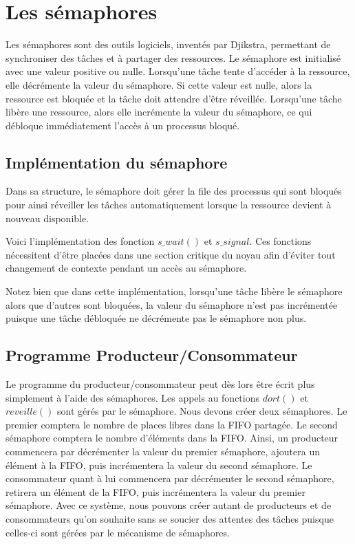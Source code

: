 \section{Les sémaphores} \label{sec:semaphores}
Les sémaphores sont des outils logiciels, inventés par Djikstra, permettant de synchroniser des tâches et à partager des ressources. Le sémaphore est initialisé avec une valeur positive ou nulle. Lorsqu'une tâche tente d'accéder à la ressource, elle décrémente la valeur du sémaphore. Si cette valeur est nulle, alors la ressource est bloquée et la tâche doit attendre d'être réveillée.
Lorsqu'une tâche libère une ressource, alors elle incrémente la valeur du sémaphore, ce qui débloque immédiatement l'accès à un processus bloqué.

\subsection{Implémentation du sémaphore}
Dans sa structure, le sémaphore doit gérer la file des processus qui sont bloqués pour ainsi réveiller les tâches automatiquement lorsque la ressource devient à nouveau disponible.


Voici l'implémentation des fonction $s\_wait()$ et $s\_signal$. Ces fonctions nécessitent d'être placées dans une section critique du noyau afin d'éviter tout changement de contexte pendant un accès au sémaphore.


Notez bien que dans cette implémentation, lorsqu'une tâche libère le sémaphore alors que d'autres sont bloquées, la valeur du sémaphore n'est pas incrémentée puisque une tâche débloquée ne décrémente pas le sémaphore non plus.

\subsection{Programme Producteur/Consommateur}
Le programme du producteur/consommateur peut dès lors être écrit plus simplement à l'aide des sémaphores. Les appels au fonctions $dort()$ et $reveille()$ sont gérés par le sémaphore.
Nous devons créer deux sémaphores. Le premier comptera le nombre de places libres dans la FIFO partagée. Le second sémaphore comptera le nombre d'éléments dans la FIFO.
Ainsi, un producteur commencera par décrémenter la valeur du premier sémaphore, ajoutera un élément à la FIFO, puis incrémentera la valeur du second sémaphore.
Le consommateur quant à lui commencera par décrémenter le second sémaphore, retirera un élément de la FIFO, puis incrémentera la valeur du premier sémaphore.
Avec ce système, nous pouvons créer autant de producteurs et de consommateurs qu'on souhaite sans se soucier des attentes des tâches puisque celles-ci sont gérées par le mécanisme de sémaphores.